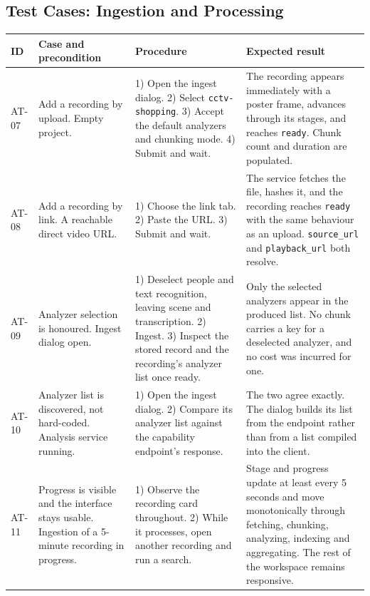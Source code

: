 \subsection{Test Cases: Ingestion and Processing}

\begin{table}[htbp]
\centering
\footnotesize
\begin{tabularx}{\textwidth}{@{}L{0.9cm}L{3.2cm}XX@{}}
\toprule
\textbf{ID} & \textbf{Case and precondition} & \textbf{Procedure} & \textbf{Expected result} \\
\midrule

AT-07 & Add a recording by upload. Empty project. &
1) Open the ingest dialog. 2) Select \texttt{cctv-shopping}. 3) Accept the default
analyzers and chunking mode. 4) Submit and wait. &
The recording appears immediately with a poster frame, advances through its stages, and
reaches \texttt{ready}. Chunk count and duration are populated. \\

AT-08 & Add a recording by link. A reachable direct video URL. &
1) Choose the link tab. 2) Paste the URL. 3) Submit and wait. &
The service fetches the file, hashes it, and the recording reaches \texttt{ready} with
the same behaviour as an upload. \texttt{source\_url} and \texttt{playback\_url} both
resolve. \\

AT-09 & Analyzer selection is honoured. Ingest dialog open. &
1) Deselect people and text recognition, leaving scene and transcription. 2) Ingest. 3)
Inspect the stored record and the recording's analyzer list once ready. &
Only the selected analyzers appear in the produced list. No chunk carries a key for a
deselected analyzer, and no cost was incurred for one. \\

AT-10 & Analyzer list is discovered, not hard-coded. Analysis service running. &
1) Open the ingest dialog. 2) Compare its analyzer list against the capability
endpoint's response. &
The two agree exactly. The dialog builds its list from the endpoint rather than from a
list compiled into the client. \\

AT-11 & Progress is visible and the interface stays usable. Ingestion of a 5-minute
recording in progress. &
1) Observe the recording card throughout. 2) While it processes, open another recording
and run a search. &
Stage and progress update at least every 5 seconds and move monotonically through
fetching, chunking, analyzing, indexing and aggregating. The rest of the workspace
remains responsive. \\


\end{tabularx}
\end{table}

